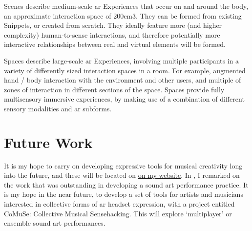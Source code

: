 Scenes describe medium-scale \gls{ar} Experiences that occur on and around the body, an approximate interaction space of 200cm3. They can be formed from existing Snippets, or created from scratch. They ideally feature more (and higher complexity) human-to-sense interactions, and therefore potentially more interactive relationships between real and virtual elements will be formed.

Spaces describe large-scale \gls{ar} Experiences, involving multiple participants in a variety of differently sized interaction spaces in a room. For example, augmented hand / body interaction with the environment and other users, and multiple of zones of interaction in different sections of the space. Spaces provide fully multisensory immersive experiences, by making use of a combination of different sensory modalities and \gls{ar} subforms.



\section{Future Work}\label{sec: conclusion-futurework}
It is my hope to carry on developing expressive tools for musical creativity long into the future, and these will be located on \href{https://sambilbow.com}{on my website}. In \textit{}, I remarked on the work that was outstanding in developing a sound \gls{art} performance practice. It is my hope in the near future, to develop a set of tools for artists and musicians interested in collective forms of \gls{ar} headset expression, with a project entitled CoMuSe: Collective Musical Sensehacking. This will explore `multiplayer' or ensemble sound \gls{art} performances.
